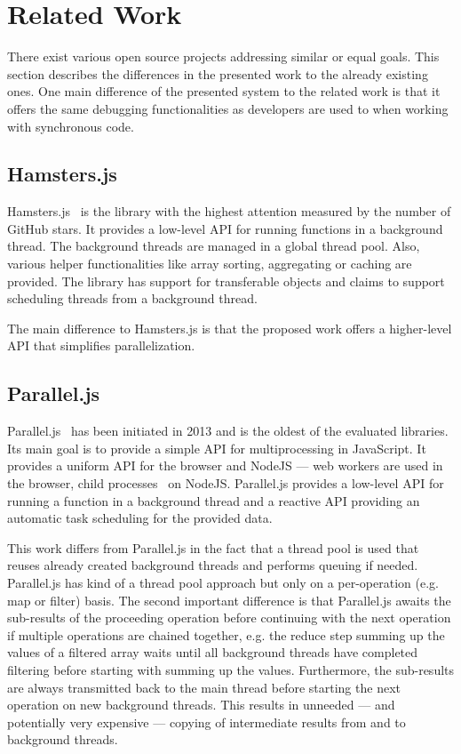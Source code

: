 \section{Related Work}\label{sec:related-work}
There exist various open source projects addressing similar or equal goals. This section describes the differences in the presented work to the already existing ones. One main difference of the presented system to the related work is that it offers the same debugging functionalities as developers are used to when working with synchronous code.

\subsection{Hamsters.js}
Hamsters.js~\cite{hamstersjs} is the library with the highest attention measured by the number of GitHub stars. It provides a low-level API for running functions in a background thread. The background threads are managed in a global thread pool. Also, various helper functionalities like array sorting, aggregating or caching are provided. The library has support for transferable objects and claims to support scheduling threads from a background thread. 

The main difference to Hamsters.js is that the proposed work offers a higher-level API that simplifies parallelization. 

\subsection{Parallel.js}
Parallel.js~\cite{SavitzkyMayr2016} has been initiated in 2013 and is the oldest of the evaluated libraries. Its main goal is to provide a simple API for multiprocessing in JavaScript. It provides a uniform API for the browser and NodeJS --- web workers are used in the browser, child processes~\cite{childProcess} on NodeJS. Parallel.js provides a low-level API for running a function in a background thread and a reactive API providing an automatic task scheduling for the provided data. 

This work differs from Parallel.js in the fact that a thread pool is used that reuses already created background threads and performs queuing if needed. Parallel.js has kind of a thread pool approach but only on a per-operation (e.g. map or filter) basis. The second important difference is that Parallel.js awaits the sub-results of the proceeding operation before continuing with the next operation if multiple operations are chained together, e.g. the reduce step summing up the values of a filtered array waits until all background threads have completed filtering before starting with summing up the values. Furthermore, the sub-results are always transmitted back to the main thread before starting the next operation on new background threads. This results in unneeded --- and potentially very expensive --- copying of intermediate results from and to background threads.


